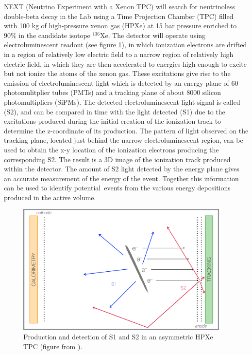 \documentclass{JINST}
\begin{document}
NEXT (Neutrino Experiment with a Xenon TPC) \cite{Gomez-Cadenas:2014dxa} will search for neutrinoless double-beta decay in the Lab using a Time Projection Chamber (TPC) filled with 100 kg of 
high-pressure xenon gas (HPXe) at 15 bar pressure enriched to 90\% in the candidate isotope $^{136}$Xe.  The detector will operate using electroluminescent readout (see figure \ref{fig.SS}), in which 
ionization electrons are drifted in a region of relatively low electric field to a narrow region of relatively high electric field, in which they are then accelerated to energies high enough to excite but not 
ionize the atoms of the xenon gas.  These excitations give rise to the emission of electroluminescent light which is detected by an energy plane of 60 photomulitplier tubes (PMTs) and a tracking 
plane of about 8000 silicon photomultipliers (SiPMs).  The detected electroluminescent light signal is called (S2), and can be compared in time with the light detected (S1) due to the excitations 
produced during the initial creation of the ionization track to determine the z-coordinate of its production.  The pattern of light observed on the tracking plane, located just behind the narrow 
electroluminescent region, can be used to obtain the x-y location of the ionization electrons producing the corresponding S2.  The result is a 3D image of the ionization track produced within the 
detector.  The amount of S2 light detected by the energy plane gives an accurate measurement of the energy of the event.  Together this information can be used to identify potential 
\bbonu\,events from the various energy depositions produced in the active volume.

\begin{figure}[!htb]
	\centering
	\includegraphics[width= 0.95\textwidth]{fig/SoftAsymmetric_bound.pdf}
	\caption{Production and detection of S1 and S2 in an asymmetric HPXe TPC (figure from \cite{MartinAlbo_thesis}).} \label{fig.SS}
\end{figure}
\end{document}
